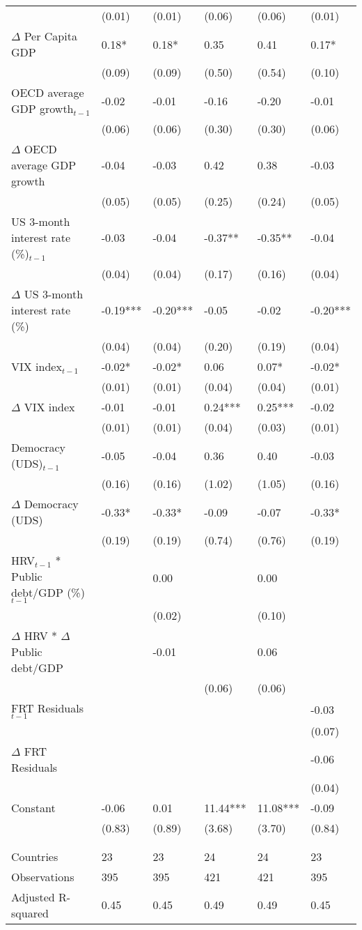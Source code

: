 \begin{tabular}{lp{3cm}p{3cm}p{3cm}p{3cm}p{3cm}}
   & (0.01) & (0.01) & (0.06) & (0.06) & (0.01) \\ 
  $\Delta$ Per Capita GDP & 0.18* & 0.18* & 0.35 & 0.41 & 0.17* \\ 
   & (0.09) & (0.09) & (0.50) & (0.54) & (0.10) \\ 
  OECD average GDP growth$_{t-1}$ & -0.02 & -0.01 & -0.16 & -0.20 & -0.01 \\ 
   & (0.06) & (0.06) & (0.30) & (0.30) & (0.06) \\ 
  $\Delta$ OECD average GDP growth & -0.04 & -0.03 & 0.42 & 0.38 & -0.03 \\ 
   & (0.05) & (0.05) & (0.25) & (0.24) & (0.05) \\ 
  US 3-month interest rate (\%)$_{t-1}$ & -0.03 & -0.04 & -0.37** & -0.35** & -0.04 \\ 
   & (0.04) & (0.04) & (0.17) & (0.16) & (0.04) \\ 
  $\Delta$ US 3-month interest rate (\%) & -0.19*** & -0.20*** & -0.05 & -0.02 & -0.20*** \\ 
   & (0.04) & (0.04) & (0.20) & (0.19) & (0.04) \\ 
  VIX index$_{t-1}$ & -0.02* & -0.02* & 0.06 & 0.07* & -0.02* \\ 
   & (0.01) & (0.01) & (0.04) & (0.04) & (0.01) \\ 
  $\Delta$ VIX index & -0.01 & -0.01 & 0.24*** & 0.25*** & -0.02 \\ 
   & (0.01) & (0.01) & (0.04) & (0.03) & (0.01) \\ 
  Democracy (UDS)$_{t-1}$ & -0.05 & -0.04 & 0.36 & 0.40 & -0.03 \\ 
   & (0.16) & (0.16) & (1.02) & (1.05) & (0.16) \\ 
  $\Delta$ Democracy (UDS) & -0.33* & -0.33* & -0.09 & -0.07 & -0.33* \\ 
   & (0.19) & (0.19) & (0.74) & (0.76) & (0.19) \\ 
  HRV$_{t-1}$ * Public debt/GDP (\%)$_{t-1}$ &  & 0.00 &  & 0.00 &  \\ 
   &  & (0.02) &  & (0.10) &  \\ 
  $\Delta$ HRV * $\Delta$ Public debt/GDP &  & -0.01 &  & 0.06 &  \\ 
   &  &  & (0.06) & (0.06) &  \\ 
  FRT Residuals$_{t-1}$ &  &  &  &  & -0.03 \\ 
   &  &  &  &  & (0.07) \\ 
  $\Delta$ FRT Residuals &  &  &  &  & -0.06 \\ 
   &  &  &  &  & (0.04) \\ 
  Constant & -0.06 & 0.01 & 11.44*** & 11.08*** & -0.09 \\ 
   & (0.83) & (0.89) & (3.68) & (3.70) & (0.84) \\ 
   &  &  &  &  &  \\ 
   &  &  &  &  &  \\ 
  Countries & 23 & 23 & 24 & 24 & 23 \\ 
  Observations & 395 & 395 & 421 & 421 & 395 \\ 
  Adjusted R-squared & 0.45 & 0.45 & 0.49 & 0.49 & 0.45 \\ 
   \hline
\end{tabular}
\endgroup
